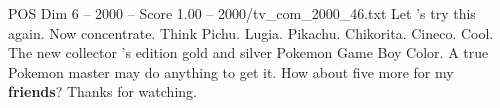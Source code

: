 \begin{textsample}{POS Dim 6 – 2000 – Score 1.00 – 2000/tv\_com\_2000\_46.txt}  \label{ex:f6_pos_088}
Let 's try this again.
Now concentrate.
Think Pichu.
Lugia.
Pikachu.
Chikorita.
Cineco.
Cool.
The new collector 's edition gold and silver Pokemon Game Boy Color.
A true Pokemon master may do anything to get it.
How about five more for my \textbf{friends}?
Thanks for watching.

\end{textsample}
